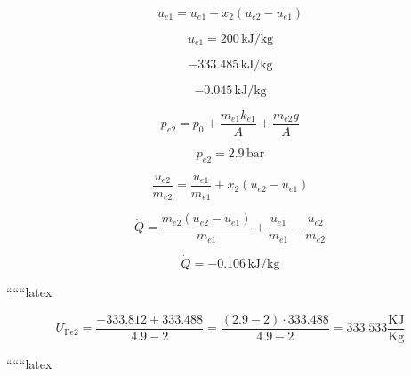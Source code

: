 \[
u_{e1} = u_{e1} + x_2 (u_{e2} - u_{e1})
\]

\[
u_{e1} = 200 \, \text{kJ/kg}
\]

\[
-333.485 \, \text{kJ/kg}
\]

\[
-0.045 \, \text{kJ/kg}
\]

\[
p_{e2} = p_0 + \frac{m_{e1} k_{e1}}{A} + \frac{m_{e2} g}{A}
\]

\[
p_{e2} = 2.9 \, \text{bar}
\]

\[
\frac{u_{e2}}{m_{e2}} = \frac{u_{e1}}{m_{e1}} + x_2 (u_{e2} - u_{e1})
\]

\[
\dot{Q} = \frac{m_{e2} (u_{e2} - u_{e1})}{m_{e1}} + \frac{u_{e1}}{m_{e1}} - \frac{u_{e2}}{m_{e2}}
\]

\[
\dot{Q} = -0.106 \, \text{kJ/kg}
\]

``````latex

\[
U_{\text{Fe2}} = \frac{-333.812 + 333.488}{4.9 - 2} = \frac{(2.9 - 2) \cdot 333.488}{4.9 - 2} = 333.533 \frac{\text{KJ}}{\text{Kg}}
\]

``````latex


